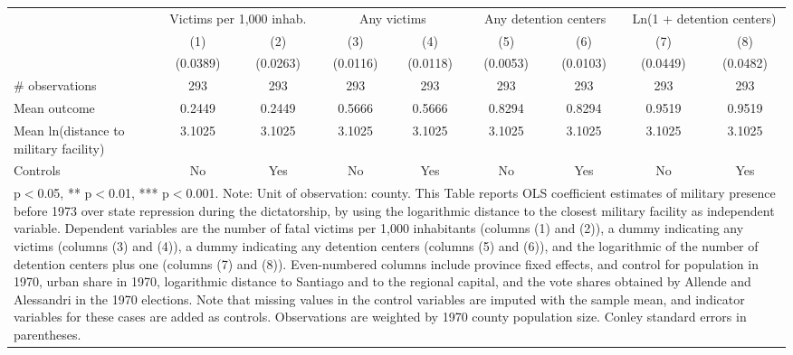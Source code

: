 {
\def\sym#1{\ifmmode^{#1}\else\(^{#1}\)\fi}
\begin{tabular}{l*{8}{c}}
\hline\hline
                    &\multicolumn{2}{c}{Victims per 1,000 inhab.}&\multicolumn{2}{c}{Any victims}            &\multicolumn{2}{c}{Any detention centers}  &\multicolumn{2}{c}{Ln(1 + detention centers)}\\\cmidrule(lr){2-3}\cmidrule(lr){4-5}\cmidrule(lr){6-7}\cmidrule(lr){8-9}
                    &\multicolumn{1}{c}{(1)}         &\multicolumn{1}{c}{(2)}         &\multicolumn{1}{c}{(3)}         &\multicolumn{1}{c}{(4)}         &\multicolumn{1}{c}{(5)}         &\multicolumn{1}{c}{(6)}         &\multicolumn{1}{c}{(7)}         &\multicolumn{1}{c}{(8)}         \\
\hline
                    &    (0.0389)         &    (0.0263)         &    (0.0116)         &    (0.0118)         &    (0.0053)         &    (0.0103)         &    (0.0449)         &    (0.0482)         \\
\hline
\# observations     &         293         &         293         &         293         &         293         &         293         &         293         &         293         &         293         \\
Mean outcome        &      0.2449         &      0.2449         &      0.5666         &      0.5666         &      0.8294         &      0.8294         &      0.9519         &      0.9519         \\
Mean ln(distance to military facility)&      3.1025         &      3.1025         &      3.1025         &      3.1025         &      3.1025         &      3.1025         &      3.1025         &      3.1025         \\
Controls            &          No         &         Yes         &          No         &         Yes         &          No         &         Yes         &          No         &         Yes         \\
\hline\hline \multicolumn{9}{p{25cm}}{\footnotesize * p$<$0.05, ** p$<$0.01, *** p$<$0.001. Note: Unit of observation: county. This Table reports OLS coefficient estimates of military presence before 1973 over state repression during the dictatorship, by using the logarithmic distance to the closest military facility as independent variable. Dependent variables are the number of fatal victims per 1,000 inhabitants (columns (1) and (2)), a dummy indicating any victims (columns (3) and (4)), a dummy indicating any detention centers (columns (5) and (6)), and the logarithmic of the number of detention centers plus one (columns (7) and (8)). Even-numbered columns include province fixed effects, and control for population in 1970, urban share in 1970, logarithmic distance to Santiago and to the regional capital, and the vote shares obtained by Allende and Alessandri in the 1970 elections. Note that missing values in the control variables are imputed with the sample mean, and indicator variables for these cases are added as controls. Observations are weighted by 1970 county population size. Conley standard errors in parentheses.}\\ \end{tabular} } %
